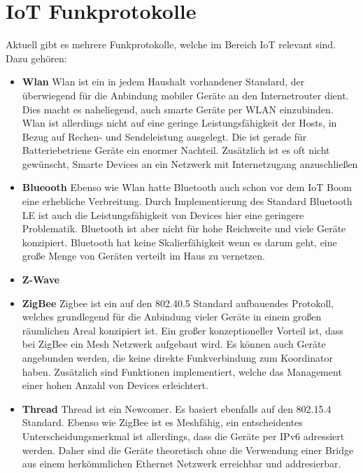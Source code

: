 \section{IoT Funkprotokolle}
Aktuell gibt es mehrere Funkprotokolle, welche im Bereich IoT relevant sind. Dazu gehören:
\begin{itemize}
    \item \textbf{Wlan}
    Wlan ist ein in jedem Haushalt vorhandener Standard, der überwiegend für die Anbindung mobiler Geräte an den
    Internetrouter dient. Dies macht es naheliegend, auch smarte Geräte per WLAN einzubinden. Wlan ist allerdings 
    nicht auf eine geringe Leistungsfähigkeit der Hosts, in Bezug auf Rechen- und Sendeleistung ausgelegt. Die ist
    gerade für Batteriebetriene Geräte ein enormer Nachteil. Zusätzlich ist es oft nicht gewünscht, Smarte Devices
    an ein Netzwerk mit Internetzugang anzuschließen

    \item \textbf{Blueooth}
    Ebenso wie Wlan hatte Bluetooth auch schon vor dem IoT Boom eine erhebliche Verbreitung. Durch Implementierung 
    des Standard Bluetooth LE ist auch die Leistungsfähigkeit von Devices hier eine geringere Problematik. Bluetooth
    ist aber nicht für hohe Reichweite und viele Geräte konzipiert. Bluetooth hat keine Skalierfähigkeit wenn es darum
    geht, eine große Menge von Geräten verteilt im Haus zu vernetzen.

    \item \textbf{Z-Wave}
    
    \item \textbf{ZigBee}
    Zigbee ist ein auf den 802.40.5 Standard aufbauendes Protokoll, welches grundlegend für die Anbindung vieler
    Geräte in einem großen räumlichen Areal konzipiert ist. Ein großer konzeptioneller Vorteil ist, dass bei 
    ZigBee ein Mesh Netzwerk aufgebaut wird. Es können auch Geräte angebunden werden, die keine direkte Funkverbindung
    zum Koordinator haben. Zusätzlich sind Funktionen implementiert, welche das Management einer hohen Anzahl von Devices
    erleichtert.
    
    \item \textbf{Thread}
    Thread ist ein Newcomer. Es basiert ebenfalls auf den 802.15.4 Standard. Ebenso wie ZigBee ist es Meshfähig, ein
    entscheidentes Unterscheidungsmerkmal ist allerdings, dass die Geräte per IPv6 adressiert werden. Daher sind die Geräte
    theoretisch ohne die Verwendung einer Bridge aus einem herkömmlichen Ethernet Netzwerk erreichbar und addresierbar.
\end{itemize}

